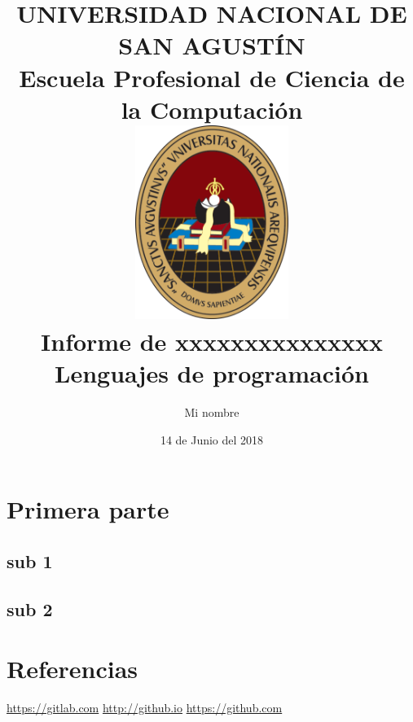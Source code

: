 \documentclass[a4paper]{article}
\title{
    \huge{UNIVERSIDAD NACIONAL DE SAN AGUSTÍN} \\
    Escuela Profesional de Ciencia de la Computación\\
    \vspace{1.5cm}
    \includegraphics[width=5cm]{logo_unsa}\\
    \vspace{1.5cm}
    Informe de xxxxxxxxxxxxxxx\\
    Lenguajes de programación
}
\author{
    Mi nombre \\ 
    \vspace{3cm}
}
\date{14 de Junio del 2018}
\begin{document}
\maketitle
\newpage
\section{Primera parte}


\subsection{sub 1}


\subsection{sub 2}



\section{Referencias}
\begin{thebibliography}{a}
    \url{https://gitlab.com}
    \url{http://github.io}
    \url{https://github.com}
\end{thebibliography}
\end{document}
